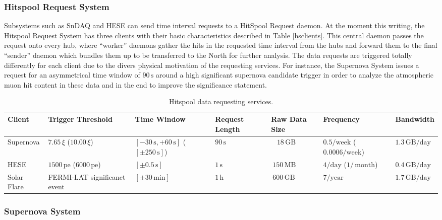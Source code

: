 \subsubsection{\label{sect:hitspool}Hitspool Request System}

Subsystems such as SnDAQ and HESE can send time interval requests to a HitSpool
Request daemon. At the moment this writing, the Hitspool Request System has three clients with their basic characteristics described in Table \ref{hsclients}. This central daemon passes the request onto every hub, where ``worker'' daemons gather the hits in the requested time interval from the hubs and forward them to the final ``sender'' daemon which bundles them up to be transferred to the North for further analysis. The data requests are triggered totally differently for each client due to the divers physical motivation of the requesting services. For instance, the Supernova System issues a request for an asymmetrical time window of $90 \,\mathrm{s}$ around a high significant supernova candidate trigger in order to analyze the atmospheric muon hit content in these data and in the end to improve the significance statement. 


\begin{table}
  \caption{Hitspool data requesting services.} 
    \centering
  \footnotesize
\begin{tabularx}{\textwidth}{XXXXXXX}
  \toprule
  Client &  Trigger Threshold & Time Window & Request Length & Raw Data Size & Frequency & Bandwidth \\
  \midrule
  Supernova & $7.65 \,\xi$ ($10.00 \,\xi$) & $[-30\,\mathrm{s},+60\,\mathrm{s}]$  ($[\pm250 \,\mathrm{s}]$)& $90 \,\mathrm{s}$& ~ $18 \,\mathrm{GB}$& $0.5/\mathrm{week}$ ($0.0006 / \mathrm{week}$)& $1.3 \,\mathrm{GB} / \mathrm{day}$\\
  HESE & $1500 \,\mathrm{pe} $  ($6000 \,\mathrm{pe} $) & $[\pm0.5\,\mathrm{s}]$& $1\,\mathrm{s}$  &  $~150\,\mathrm{MB}$ &  $4/\mathrm{day}$ ($1/\,\mathrm{month}$) & $0.4\,\mathrm{GB}/\mathrm{day}$  \\
  Solar Flare & FERMI-LAT significanct event & $[\pm30\,\mathrm{min}]$ & $1\,\mathrm{h}$& $~600\,\mathrm{GB}$& $ 7 / \mathrm{year}$& $ 1.7 \,\mathrm{GB}/\mathrm{day}$\\
\bottomrule
\end{tabularx}
\label{tab:hsclients}
\end{table}

\subsubsection{Supernova System}

